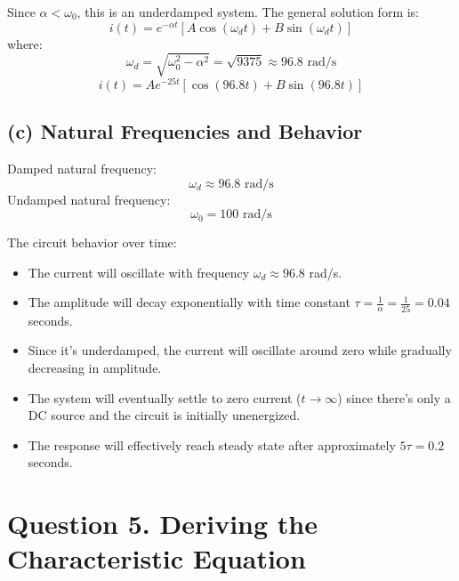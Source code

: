 \documentclass[12pt]{article}
\begin{document}
	Since $\alpha < \omega_0$, this is an underdamped system.
	The general solution form is:
	\begin{equation}
		i(t) = e^{-\alpha t} \left[A \cos(\omega_d t) + B \sin(\omega_d t)\right]
	\end{equation}
	where:
	\begin{equation}
		\omega_d = \sqrt{\omega_0^2 - \alpha^2} = \sqrt{9375} \approx 96.8 \text{ rad/s}
	\end{equation}
	\begin{equation}
		i(t) = A e^{-25t} \left[ \cos(96.8t) + B \sin(96.8t) \right]
	\end{equation}
	
	\subsection*{(c) Natural Frequencies and Behavior}
	Damped natural frequency:
	\begin{equation}
		\omega_d \approx 96.8 \text{ rad/s}
	\end{equation}
	Undamped natural frequency:
	\begin{equation}
		\omega_0 = 100 \text{ rad/s}
	\end{equation}
	
	The circuit behavior over time:
	\begin{itemize}
		\item The current will oscillate with frequency $\omega_d \approx 96.8$ rad/s.
		\item The amplitude will decay exponentially with time constant $\tau = \frac{1}{\alpha} = \frac{1}{25} = 0.04$ seconds.
		\item Since it's underdamped, the current will oscillate around zero while gradually decreasing in amplitude.
		\item The system will eventually settle to zero current ($t \to \infty$) since there's only a DC source and the circuit is initially unenergized.
		\item The response will effectively reach steady state after approximately $5\tau = 0.2$ seconds.
	\end{itemize}
	
	
	
	
	
	\section*{ Question 5. Deriving the Characteristic Equation}
	
\end{document}
